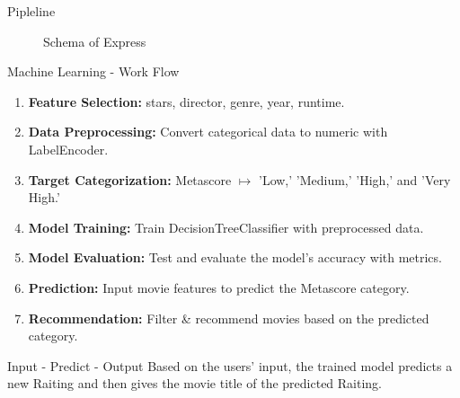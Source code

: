 \documentclass[xetex,notheorems,hyperref={pdfpagelabels=true},xcolor=table]{beamer}
\theoremstyle{plain}
\theoremstyle{definition}
\theoremstyle{example}
\theoremstyle{example}
\begin{document}
\begin{frame}{Pipleline}
\begin{figure}[h]
  \caption{Schema of Express}
\end{figure}
\end{frame}

\begin{frame}{Machine Learning - Work Flow}
    \begin{enumerate}[1)]
      \item \textbf{Feature Selection:} stars, director, genre, year, runtime.
\item \textbf{Data Preprocessing:} Convert categorical data to numeric with LabelEncoder.
\item \textbf{Target Categorization:} Metascore $\mapsto$ 'Low,' 'Medium,' 'High,' and 'Very High.'
\item \textbf{Model Training:} Train DecisionTreeClassifier with preprocessed data.
\item \textbf{Model Evaluation:} Test and evaluate the model's accuracy with metrics.
\item \textbf{Prediction:} Input movie features to predict the Metascore category.
\item \textbf{Recommendation:} Filter \& recommend movies based on the predicted category.
    \end{enumerate}
\begin{block}{Input - Predict - Output}
Based on the users' input, the trained model predicts a new Raiting and then gives the movie title of the predicted Raiting. 
\end{block}
\end{frame}
\end{document}
